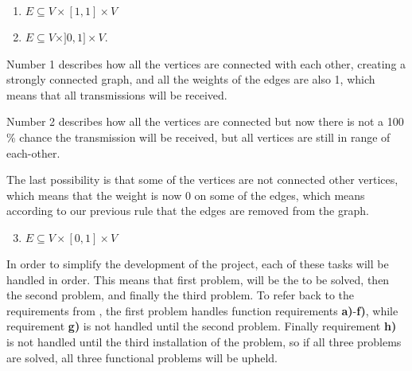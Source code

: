 \begin{enumerate}
\item $E \subseteq V \times [1,1] \times V$
\item $E \subseteq V \times ]0,1] \times V$. 
\end{enumerate}

Number 1 describes how all the vertices are connected with each other, creating a strongly connected graph, and all the weights of the edges are also 1, which means that all transmissions will be received.

Number 2 describes how all the vertices are connected but now there is not a 100 \% chance the transmission will be received, but all vertices are still in range of each-other.

The last possibility is that some of the vertices are not connected other vertices, which means that the weight is now 0 on some of the edges, which means according to our previous rule that the edges are removed from the graph.

\begin{enumerate}
\setcounter{enumi}{2}
\item $E \subseteq V \times [0,1] \times V$ 
\end{enumerate}

In order to simplify the development of the project, each of these tasks will be handled in order.
This means that first problem, will be the to be solved, then the second problem, and finally the third problem.
To refer back to the requirements from , the first problem handles function requirements \textbf{a)}-\textbf{f)}, while requirement \textbf{g)} is not handled until the second problem.
Finally requirement \textbf{h)} is not handled until the third installation of the problem, so if all three problems are solved, all three functional problems will be upheld.